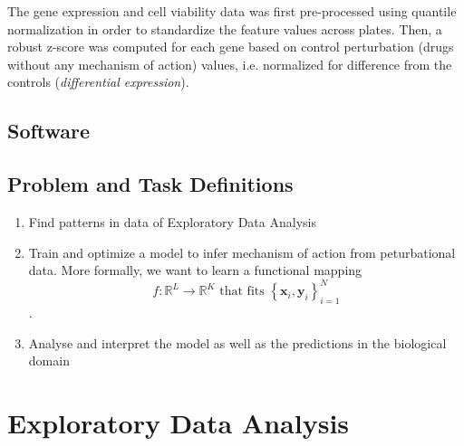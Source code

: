 \documentclass[bsc,frontabs,twoside,singlespacing,parskip,deptreport]{infthesis}     %
\let\Oldsection\section
\renewcommand{\section}{\FloatBarrier\Oldsection}
\begin{document}
The gene expression and cell viability data was first pre-processed using quantile normalization in order to standardize the feature values across plates. Then, a robust z-score was computed for each gene based on control perturbation (drugs without any mechanism of action) values, i.e. normalized for difference from the controls (\textit{differential expression}).


\section{Software}

\section{Problem and Task Definitions}
\begin{enumerate}
    \item Find patterns in data of Exploratory Data Analysis
    \item Train and optimize a model to infer mechanism of action from peturbational data. More formally, we want to learn a functional mapping \[f: \mathbb{R}^{L} \rightarrow \mathbb{R}^{K} \text { that fits }\left\{\mathbf{x}_{i}, \mathbf{y}_{i}\right\}_{i=1}^{N}\].
    \item Analyse and interpret the model as well as the predictions in the biological domain 
\end{enumerate}



\chapter{Exploratory Data Analysis}

\end{document}
